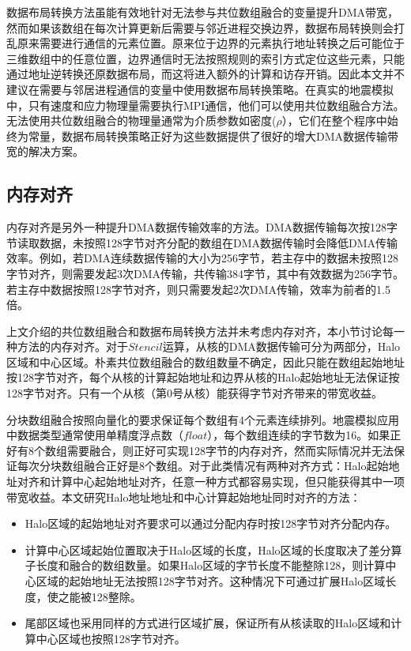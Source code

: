 数据布局转换方法虽能有效地针对无法参与共位数组融合的变量提升DMA带宽，然而如果该数组在每次计算更新后需要与邻近进程交换边界，数据布局转换则会打乱原来需要进行通信的元素位置。原来位于边界的元素执行地址转换之后可能位于三维数组中的任意位置，边界通信时无法按照规则的索引方式定位这些元素，只能通过地址逆转换还原数据布局，而这将进入额外的计算和访存开销。因此本文并不建议在需要与邻居进程通信的变量中使用数据布局转换策略。在真实的地震模拟中，只有速度和应力物理量需要执行MPI通信，他们可以使用共位数组融合方法。无法使用共位数组融合的物理量通常为介质参数如密度($\rho$），它们在整个程序中始终为常量，数据布局转换策略正好为这些数据提供了很好的增大DMA数据传输带宽的解决方案。

\subsection{内存对齐}

内存对齐是另外一种提升DMA数据传输效率的方法。DMA数据传输每次按128字节读取数据，未按照128字节对齐分配的数组在DMA数据传输时会降低DMA传输效率。例如，若DMA连续数据传输的大小为256字节，若主存中的数据未按照128字节对齐，则需要发起3次DMA传输，共传输384字节，其中有效数据为256字节。若主存中数据按照128字节对齐，则只需要发起2次DMA传输，效率为前者的1.5倍。

上文介绍的共位数组融合和数据布局转换方法并未考虑内存对齐，本小节讨论每一种方法的内存对齐。对于$Stencil$运算，从核的DMA数据传输可分为两部分，Halo区域和中心区域。朴素共位数组融合的数组数量不确定，因此只能在数组起始地址按128字节对齐，每个从核的计算起始地址和边界从核的Halo起始地址无法保证按128字节对齐。只有一个从核（第0号从核）能获得字节对齐带来的带宽收益。

分块数组融合按照向量化的要求保证每个数组有4个元素连续排列。地震模拟应用中数据类型通常使用单精度浮点数（$float$），每个数组连续的字节数为16。如果正好有8个数组需要融合，则正好可实现128字节的内存对齐，然而实际情况并无法保证每次分块数组融合正好是8个数组。对于此类情况有两种对齐方式：Halo起始地址对齐和计算中心起始地址对齐，任意一种方式都容易实现，但只能获得其中一项带宽收益。本文研究Halo地址地址和中心计算起始地址同时对齐的方法：
\begin{itemize}
  \item Halo区域的起始地址对齐要求可以通过分配内存时按128字节对齐分配内存。
  \item 计算中心区域起始位置取决于Halo区域的长度，Halo区域的长度取决了差分算子长度和融合的数组数量。如果Halo区域的字节长度不能整除128，则计算中心区域的起始地址无法按照128字节对齐。这种情况下可通过扩展Halo区域长度，使之能被128整除。
  \item 尾部区域也采用同样的方式进行区域扩展，保证所有从核读取的Halo区域和计算中心区域也按照128字节对齐。
\end{itemize}

